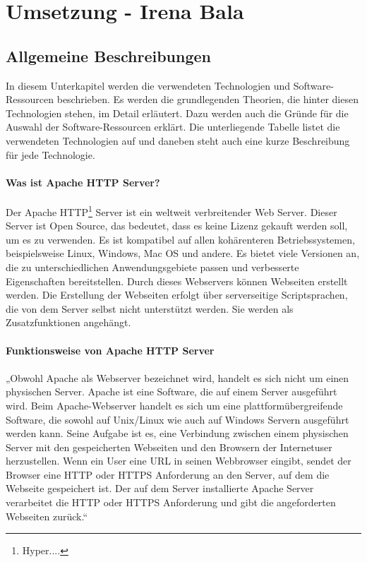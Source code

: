 \chapter{Umsetzung - Irena Bala}
\section{Allgemeine Beschreibungen}
In diesem Unterkapitel werden die verwendeten Technologien und Software-Ressourcen beschrieben.  Es werden die grundlegenden Theorien, die hinter diesen Technologien stehen, im Detail erläutert. Dazu werden auch die Gründe für die Auswahl der Software-Ressourcen erklärt. 
Die unterliegende Tabelle listet die verwendeten Technologien auf und daneben steht auch eine kurze Beschreibung für jede Technologie. \cite[Seite5]{einstein,knuthwebsite}
\subsubsection{Was ist Apache HTTP Server?} 
Der Apache HTTP\footnote{Hyper....} Server ist ein weltweit verbreitender Web Server. Dieser Server ist Open Source, das bedeutet, dass es keine Lizenz gekauft werden soll, um es zu verwenden. Es ist kompatibel auf allen kohärenteren Betriebssystemen, beispielsweise Linux, Windows, Mac OS und andere. Es bietet viele Versionen an, die zu unterschiedlichen Anwendungsgebiete passen und verbesserte Eigenschaften bereitstellen. Durch dieses Webservers können Webseiten erstellt werden. Die Erstellung der Webseiten erfolgt über serverseitige Scriptsprachen, die von dem Server selbst nicht unterstützt werden. Sie werden als Zusatzfunktionen angehängt. 
\\
\\
\textbf{Funktionsweise von Apache HTTP Server} \\
\\
„Obwohl Apache als Webserver bezeichnet wird, handelt es sich nicht um einen physischen Server. Apache ist eine Software, die auf einem Server ausgeführt wird. Beim Apache-Webserver handelt es sich um eine plattformübergreifende Software, die sowohl auf Unix/Linux wie auch auf Windows Servern ausgeführt werden kann. Seine Aufgabe ist es, eine Verbindung zwischen einem physischen Server mit den gespeicherten Webseiten und den Browsern der Internetuser herzustellen.
Wenn ein User eine URL in seinen Webbrowser eingibt, sendet der Browser eine HTTP oder HTTPS Anforderung an den Server, auf dem die Webseite gespeichert ist. Der auf dem Server installierte Apache Server verarbeitet die HTTP oder HTTPS Anforderung und gibt die angeforderten Webseiten zurück.“ \\
